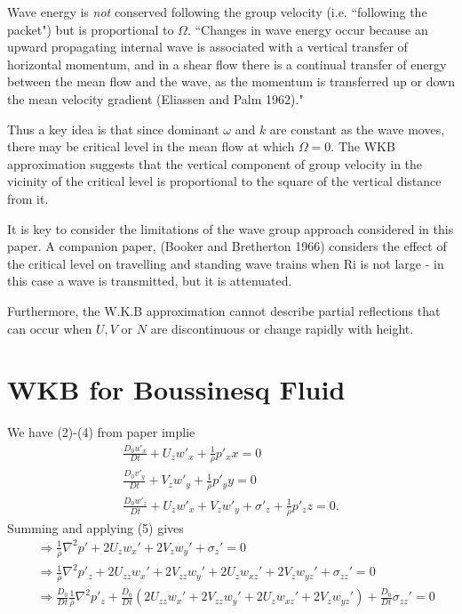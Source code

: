 \documentclass[12pt]{article}
\begin{document}
Wave energy is \textit{not} conserved following the group velocity (i.e. ``following the packet") but is proportional to $\Omega$. ``Changes in wave energy occur because an upward propagating internal wave is associated with a vertical transfer of horizontal momentum, and in a shear flow there is a continual transfer of energy between the mean flow and the wave, as the momentum is transferred up or down the mean velocity gradient (Eliassen and Palm 1962)."

Thus a key idea is that since dominant $\omega$ and $k$ are constant as the wave moves, there may be critical level in the mean flow at which $\Omega = 0$. The WKB approximation suggests that the vertical component of group velocity in the vicinity of the critical level is proportional to the square of the vertical distance from it.

It is key to consider the limitations of the wave group approach considered in this paper. A companion paper, (Booker and Bretherton 1966) considers the effect of the critical level on travelling and standing wave trains when Ri is not large - in this case a wave is transmitted, but it is attenuated. 

Furthermore, the W.K.B approximation cannot describe partial reflections that can occur when $U,V$ or $N$ are discontinuous or change rapidly with height. 

\section{WKB for Boussinesq Fluid}
We have (2)-(4) from paper implie
\begin{align*}
\frac{D_0 u'_x}{Dt} + U_z w'_x +\frac{1}{\overline{\rho}}p'_xx = 0 \\
\frac{D_0 v'_y}{Dt} + V_z w'_y +\frac{1}{\overline{\rho}}p'_yy = 0 \\
\frac{D_0 w'_z}{Dt} + U_z w'_x + V_z w'_y + \sigma'_z +\frac{1}{\overline{\rho}}p'_zz = 0.
\end{align*}
Summing and applying (5) gives
\begin{align}
&\Rightarrow \frac{1}{\overline{\rho}}\nabla^2 p' +2U_zw_x'+2V_zw_y' + \sigma_z' = 0 \\
&\Rightarrow \frac{1}{\overline{\rho}}\nabla^2 p'_z +2U_{zz}w_x'+2V_{zz}w_y' + 2U_zw_{xz}'+2V_z w_{yz}' + \sigma_{zz}' = 0 \\
&\Rightarrow \frac{D_0}{Dt}\frac{1}{\overline{\rho}}\nabla^2 p'_z + \frac{D_0}{Dt}\left(2U_{zz}w_x'+2V_{zz}w_y' + 2U_zw_{xz}'+2V_z w_{yz}' \right) + \frac{D_0}{Dt}\sigma_{zz}' = 0 \label{Eq:diamond}
\end{align}
\end{document}
